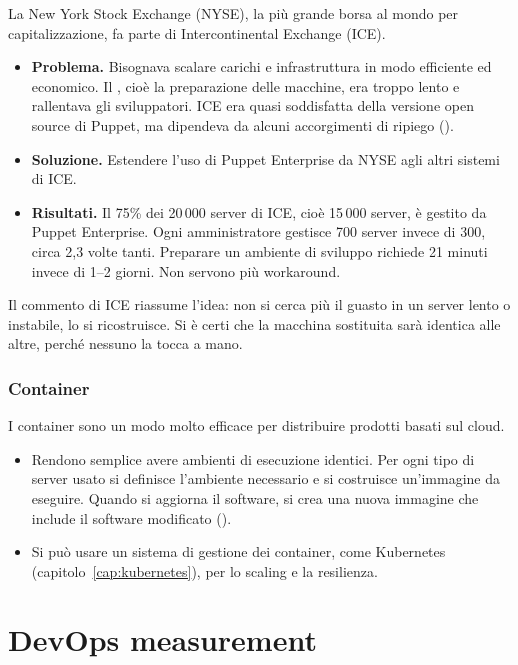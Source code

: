 \begin{esempio}
La New York Stock Exchange (NYSE), la più grande borsa al mondo per capitalizzazione, fa parte di Intercontinental
Exchange (ICE).
\begin{itemize}
  \item \textbf{Problema.} Bisognava scalare carichi e infrastruttura in modo efficiente ed economico. Il
    , cioè la preparazione delle macchine, era troppo lento e rallentava gli sviluppatori. ICE era
    quasi soddisfatta della versione open source di Puppet, ma dipendeva da alcuni accorgimenti di ripiego
    ().
  \item \textbf{Soluzione.} Estendere l'uso di Puppet Enterprise da NYSE agli altri sistemi di ICE.
  \item \textbf{Risultati.} Il 75\% dei 20\,000 server di ICE, cioè 15\,000 server, è gestito da Puppet Enterprise.
    Ogni amministratore gestisce 700 server invece di 300, circa 2,3 volte tanti. Preparare un ambiente di sviluppo
    richiede 21 minuti invece di 1--2 giorni. Non servono più workaround.
\end{itemize}
Il commento di ICE riassume l'idea: non si cerca più il guasto in un server lento o instabile, lo si ricostruisce. Si
è certi che la macchina sostituita sarà identica alle altre, perché nessuno la tocca a mano.
\end{esempio}

\subsubsection{Container}
I container sono un modo molto efficace per distribuire prodotti basati sul cloud.
\begin{itemize}
  \item Rendono semplice avere ambienti di esecuzione identici. Per ogni tipo di server usato si definisce l'ambiente
    necessario e si costruisce un'immagine da eseguire. Quando si aggiorna il software, si crea una nuova immagine che
    include il software modificato ().
  \item Si può usare un sistema di gestione dei container, come Kubernetes (capitolo~\ref{cap:kubernetes}), per lo
    scaling e la resilienza.
\end{itemize}

\section{DevOps measurement}
\label{sec:devops-misura}

